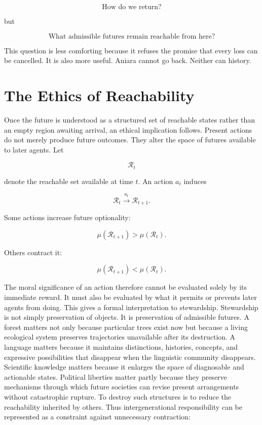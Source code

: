 \documentclass[11pt,oneside]{book}
\theoremstyle{definition}
\theoremstyle{remark}
\begin{document}
\[
\text{How do we return?}
\]

but

\[
\text{What admissible futures remain reachable from here?}
\]

This question is less comforting because it refuses the promise that every loss can be cancelled. It
is also more useful. Aniara cannot go back. Neither can history.

\section*{The Ethics of Reachability}

Once the future is understood as a structured set of reachable states rather than an empty region
awaiting arrival, an ethical implication follows. Present actions do not merely produce future
outcomes. They alter the space of futures available to later agents. Let

\[
\mathcal{R}_t
\]

denote the reachable set available at time \(t\). An action \(a_t\) induces

\[
\mathcal{R}_t \xrightarrow{a_t} \mathcal{R}_{t+1}.
\]

Some actions increase future optionality:

\[
\mu(\mathcal{R}_{t+1}) > \mu(\mathcal{R}_t).
\]

Others contract it:

\[
\mu(\mathcal{R}_{t+1}) < \mu(\mathcal{R}_t).
\]

The moral significance of an action therefore cannot be evaluated solely by its immediate reward. It
must also be evaluated by what it permits or prevents later agents from doing. This gives a formal
interpretation to stewardship. Stewardship is not simply preservation of objects. It is preservation
of admissible futures. A forest matters not only because particular trees exist now but because a
living ecological system preserves trajectories unavailable after its destruction. A language
matters because it maintains distinctions, histories, concepts, and expressive possibilities that
disappear when the linguistic community disappears. Scientific knowledge matters because it enlarges
the space of diagnosable and actionable states. Political liberties matter partly because they
preserve mechanisms through which future societies can revise present arrangements without
catastrophic rupture. To destroy such structures is to reduce the reachability inherited by others.
Thus intergenerational responsibility can be represented as a constraint against unnecessary
contraction:
\end{document}
